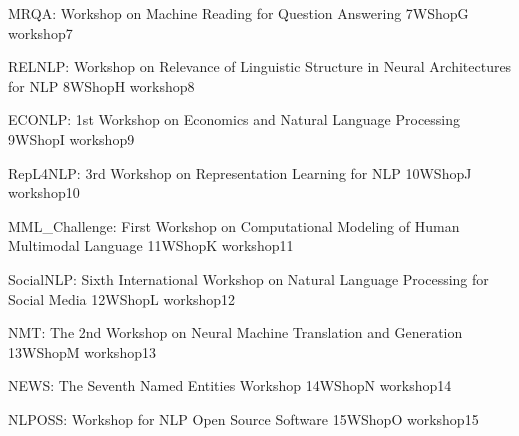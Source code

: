 \begin{wsschedule}
  {MRQA: Workshop on Machine Reading for Question Answering}
  {7}{WShopG}
  {workshop7}
  {\WShopLocG}
  
\end{wsschedule}

\begin{wsschedule}
  {RELNLP: Workshop on Relevance of Linguistic Structure in Neural 
  Architectures for NLP}
  {8}{WShopH}
  {workshop8}
  {\WShopLocH}
  
\end{wsschedule}



\begin{wsschedule}
  {ECONLP: 1st Workshop on Economics and Natural Language Processing}
  {9}{WShopI}
  {workshop9}
  {\WShopLocI}
  
\end{wsschedule}

\begin{wsschedule}
  {RepL4NLP: 3rd Workshop on Representation Learning for NLP}
  {10}{WShopJ}
  {workshop10}
  {\WShopLocJ}
  
\end{wsschedule}

\begin{wsschedule}
  {MML\_Challenge: First Workshop on Computational Modeling of Human 
  Multimodal Language}
  {11}{WShopK}
  {workshop11}
  {\WShopLocK}
  
\end{wsschedule}

\begin{wsschedule}
  {SocialNLP: Sixth International Workshop on Natural Language 
  Processing for Social Media}
  {12}{WShopL}
  {workshop12}
  {\WShopLocL}
  
\end{wsschedule}

\begin{wsschedule}
  {NMT: The 2nd Workshop on Neural Machine Translation and Generation}
  {13}{WShopM}
  {workshop13}
  {\WShopLocM}
  
\end{wsschedule}

\begin{wsschedule}
  {NEWS: The Seventh Named Entities Workshop}
  {14}{WShopN}
  {workshop14}
  {\WShopLocN}
  
\end{wsschedule}

\begin{wsschedule}
  {NLPOSS: Workshop for NLP Open Source Software}
  {15}{WShopO}
  {workshop15}
  {\WShopLocO}
  
\end{wsschedule}

